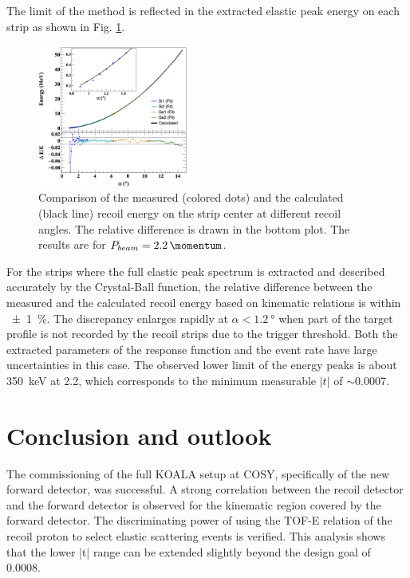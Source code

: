 \documentclass[number,5p]{elsarticle}
\begin{document}
The limit of the method is reflected in the extracted elastic peak energy on each strip as shown in
Fig. \ref{fig:measured_vs_calculated}.
\begin{figure}[h!]
  \centering
  \includegraphics[width=0.45\textwidth]{./e_vs_alpha_combined.png}
  \caption{
    Comparison of the measured (colored dots) and the calculated (black line)
    recoil energy on the strip center at different recoil angles. The relative
    difference is drawn in the bottom plot. The results are for $P_{beam} = \SI{2.2}{\momentum}$.}
  \label{fig:measured_vs_calculated}
\end{figure}
For the strips where the full elastic peak spectrum is extracted and described accurately
by the Crystal-Ball function, the relative difference between the measured and
the calculated recoil energy based on kinematic relations is within \SI{\pm 1}{\percent}.
The discrepancy enlarges rapidly at $\alpha < \SI{1.2}{\degree}$ when part of
the target profile is not recorded by the recoil strips due to the trigger threshold.
Both the extracted parameters of the response function and the event rate have large uncertainties in this case.
The observed lower limit of the energy peaks is about \SI{350}{\keV} at \SI{2.2}{\momentum}, which corresponds to the minimum measurable $|t|$ of $\sim$\SI{0.0007}{\tmom}.

\section{Conclusion and outlook}
\label{sec:conclusion}

The commissioning of the full KOALA setup at COSY, specifically of the new forward detector, was successful.
A strong correlation between the recoil detector and the forward detector is
observed for the kinematic region covered by the forward detector.
The discriminating power of using the TOF-E relation of the recoil proton to select elastic
scattering events is verified.
This analysis shows that the lower |t| range can be extended slightly beyond the design goal of \SI{0.0008}{\tmom}.
\end{document}
